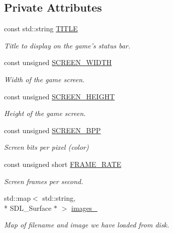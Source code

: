 \subsection*{Private Attributes}
\begin{DoxyCompactItemize}
\item 
const std\-::string \hyperlink{classGraphicsEngine_afc40023b292929b8b8e53c58b7e8f574}{T\-I\-T\-L\-E}
\begin{DoxyCompactList}\small\item\em Title to display on the game's status bar. \end{DoxyCompactList}\item 
const unsigned \hyperlink{classGraphicsEngine_ac243d365dcf3e8a14f8ff1a838479429}{S\-C\-R\-E\-E\-N\-\_\-\-W\-I\-D\-T\-H}
\begin{DoxyCompactList}\small\item\em Width of the game screen. \end{DoxyCompactList}\item 
const unsigned \hyperlink{classGraphicsEngine_a22ccc86caef4284dcf8600ef846e3897}{S\-C\-R\-E\-E\-N\-\_\-\-H\-E\-I\-G\-H\-T}
\begin{DoxyCompactList}\small\item\em Height of the game screen. \end{DoxyCompactList}\item 
const unsigned \hyperlink{classGraphicsEngine_a3ff7024552553e73dd9edaef063284e0}{S\-C\-R\-E\-E\-N\-\_\-\-B\-P\-P}
\begin{DoxyCompactList}\small\item\em Screen bits per pixel (color) \end{DoxyCompactList}\item 
const unsigned short \hyperlink{classGraphicsEngine_a488d694ad4eea9bbbe68fc4d98cde8bf}{F\-R\-A\-M\-E\-\_\-\-R\-A\-T\-E}
\begin{DoxyCompactList}\small\item\em Screen frames per second. \end{DoxyCompactList}\item 
std\-::map$<$ std\-::string, \\*
S\-D\-L\-\_\-\-Surface $\ast$ $>$ \hyperlink{classGraphicsEngine_a5058ffe9d65389df4207db6be00ac889}{images\-\_\-}
\begin{DoxyCompactList}\small\item\em Map of filename and image we have loaded from disk. \end{DoxyCompactList}\item 

\end{DoxyCompactItemize}
